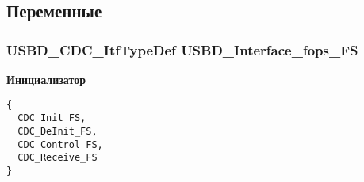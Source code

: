 \subsection{Переменные}
\hypertarget{group___u_s_b_d___c_d_c___i_f_g99394ed19b774f171df96c2848c411ed}{
\subsubsection[{USBD\_\-Interface\_\-fops\_\-FS}]{\setlength{\rightskip}{0pt plus 5cm}USBD\_\-CDC\_\-ItfTypeDef USBD\_\-Interface\_\-fops\_\-FS}}
\label{group___u_s_b_d___c_d_c___i_f_g99394ed19b774f171df96c2848c411ed}


\textbf{Инициализатор}

\begin{Code}\begin{verbatim}
{
  CDC_Init_FS,
  CDC_DeInit_FS,
  CDC_Control_FS,
  CDC_Receive_FS
}
\end{verbatim}
\end{Code}
